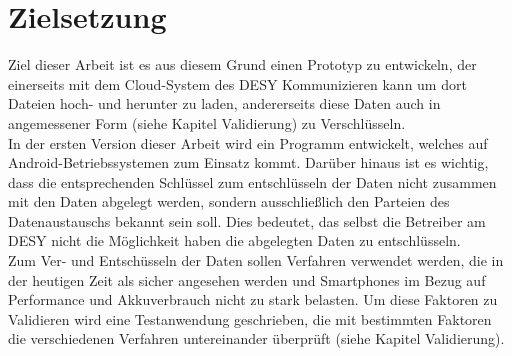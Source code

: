 \documentclass[10pt, a4paper,headsepline]{scrreprt}
\begin{document}
\section{Zielsetzung}
Ziel dieser Arbeit ist es aus diesem Grund einen Prototyp zu entwickeln, der einerseits mit dem Cloud-System des DESY Kommunizieren kann um dort Dateien hoch- und herunter zu laden, andererseits diese Daten auch in angemessener Form (siehe Kapitel Validierung) zu Verschlüsseln. \\
In der ersten Version dieser Arbeit wird ein Programm entwickelt, welches auf Android-Betriebssystemen zum Einsatz kommt. Darüber hinaus ist es wichtig, dass die entsprechenden Schlüssel zum entschlüsseln der Daten nicht zusammen mit den Daten abgelegt werden, sondern ausschließlich den Parteien des Datenaustauschs bekannt sein soll. Dies bedeutet, das selbst die Betreiber am DESY nicht die Möglichkeit haben die abgelegten Daten zu entschlüsseln. \\
Zum Ver- und Entschüsseln der Daten sollen Verfahren verwendet werden, die in der heutigen Zeit als sicher angesehen werden und Smartphones im Bezug auf Performance und Akkuverbrauch nicht zu stark belasten. Um diese Faktoren zu Validieren wird eine Testanwendung geschrieben, die mit bestimmten Faktoren die verschiedenen Verfahren untereinander überprüft (siehe Kapitel Validierung).





\end{document}
